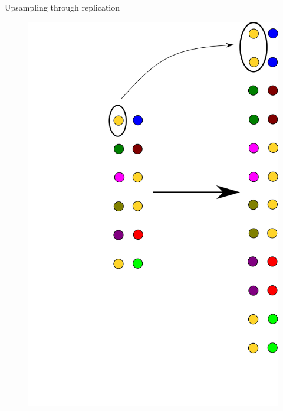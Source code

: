 \documentclass[xcolor=pdftex,dvipsnames,table,mathserif]{beamer}
\begin{document}
\begin{frame}{Upsampling through replication}

  \begin{figure}
      \includegraphics[height=0.8\textheight]{upsampling.png}
    \end{figure}

\end{frame}
\end{document}
